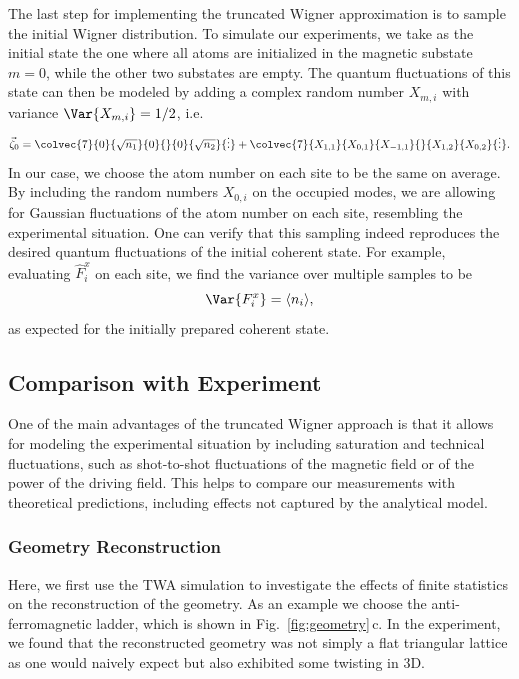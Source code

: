 \begin{bibunit}
The last step for implementing the truncated Wigner approximation is to sample the initial Wigner distribution. To simulate our experiments, we take as the initial state the one where all atoms are initialized in the magnetic substate $m = 0$, while the other two substates are empty. The quantum fluctuations of this state can then be modeled by adding a complex random number $X_{m,i}$ with variance $\Var{X_{m,i}} = 1/2$, i.e.
\begin{equation}
    \vec{\zeta}_0 =   \colvec{7}{0}{\sqrt{n_1}}{0}{}{0}{\sqrt{n_2}}{\vdots} + \colvec{7}{X_{1,1}}{X_{0,1}}{X_{-1,1}}{}{X_{1,2}}{X_{0,2}}{\vdots}.
\end{equation}
In our case, we choose the atom number on each site to be the same on average. By including the random numbers $X_{0,i}$ on the occupied modes, we are allowing for Gaussian fluctuations of the atom number on each site, resembling the experimental situation. One can verify that this sampling indeed reproduces the desired quantum fluctuations of the initial coherent state. For example, evaluating $\hat{F}^x_{i}$ on each site, we find the variance over multiple samples to be
\begin{equation}
    \Var{F^x_{i}} = \langle n_i\rangle,
\end{equation}
as expected for the initially prepared coherent state.
\subsection{Comparison with Experiment}
One of the main advantages of the truncated Wigner approach is that it allows for modeling the experimental situation by including saturation and technical fluctuations, such as shot-to-shot fluctuations of the magnetic field or of the power of the driving field. This helps to compare our measurements with theoretical predictions, including effects not captured by the analytical model.

\subsubsection{Geometry Reconstruction}
Here, we first use the TWA simulation to investigate the effects of finite statistics on the reconstruction of the geometry. As an example we choose the anti-ferromagnetic ladder, which is shown in Fig.~\ref{fig:geometry}\,c. In the experiment, we found that the reconstructed geometry was not simply a flat triangular lattice as one would naively expect but also exhibited some twisting in 3D. 


\end{bibunit}
